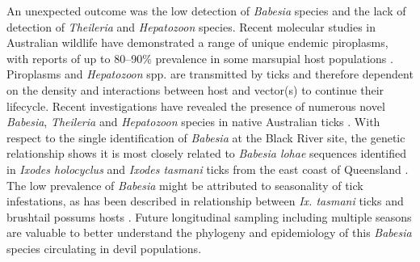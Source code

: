 \documentclass[a4paper, nobind]{templates/ociamthesis}
\begin{document}
An unexpected outcome was the low detection of \emph{Babesia} species and the lack of detection of \emph{Theileria} and \emph{Hepatozoon} species.
Recent molecular studies in Australian wildlife have demonstrated a range of unique endemic piroplasms, with reports of up to 80--90\% prevalence in some marsupial host populations \autocite{rongHighPrevalenceTheileria2012,papariniFirstMolecularCharacterization2015,northoverIncreasedTrypanosomaSpp2019}.
Piroplasms and \emph{Hepatozoon} spp. are transmitted by ticks and therefore dependent on the density and interactions between host and vector(s) to continue their lifecycle.
Recent investigations have revealed the presence of numerous novel \emph{Babesia}, \emph{Theileria} and \emph{Hepatozoon} species in native Australian ticks \autocite{greayEndemicExoticNovel2018,lohMolecularSurveillancePiroplasms2018,storey-lewisMolecularDetectionCharacterisation2018}.
With respect to the single identification of \emph{Babesia} at the Black River site, the genetic relationship shows it is most closely related to \emph{Babesia lohae} sequences identified in \emph{Ixodes holocyclus} and \emph{Ixodes tasmani} ticks from the east coast of Queensland \autocite{greayEndemicExoticNovel2018,lohMolecularSurveillancePiroplasms2018}.
The low prevalence of \emph{Babesia} might be attributed to seasonality of tick infestations, as has been described in relationship between \emph{Ix. tasmani} ticks and brushtail possums hosts \autocite{murdochEcologyCommonMarsupial2005}.
Future longitudinal sampling including multiple seasons are valuable to better understand the phylogeny and epidemiology of this \emph{Babesia} species circulating in devil populations.
\end{document}
